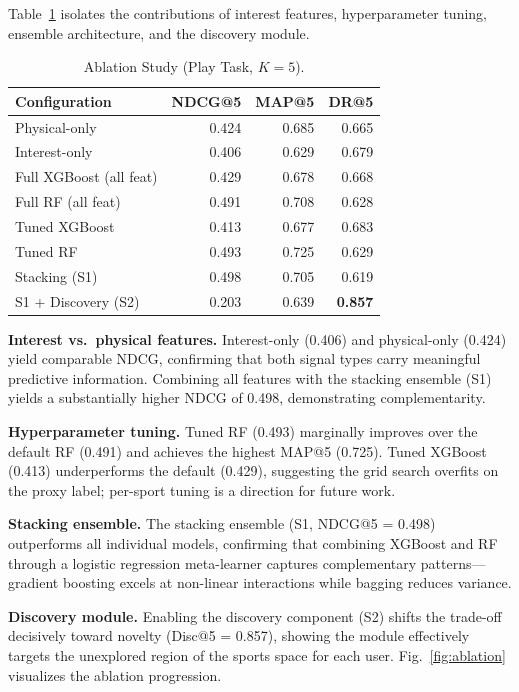 \documentclass[conference]{IEEEtran}
\begin{document}
Table~\ref{tab:ablation} isolates the contributions of interest features,
hyperparameter tuning, ensemble architecture, and the discovery module.

\begin{table}[t]
\caption{Ablation Study (Play Task, $K{=}5$).}
\label{tab:ablation}
\centering
\small
\begin{tabular}{lrrr}
\toprule
\textbf{Configuration} & \textbf{NDCG@5} & \textbf{MAP@5} & \textbf{DR@5} \\
\midrule
Physical-only           & 0.424 & 0.685 & 0.665 \\
Interest-only           & 0.406 & 0.629 & 0.679 \\
Full XGBoost (all feat) & 0.429 & 0.678 & 0.668 \\
Full RF (all feat)      & 0.491 & 0.708 & 0.628 \\
Tuned XGBoost           & 0.413 & 0.677 & 0.683 \\
Tuned RF                & 0.493 & 0.725 & 0.629 \\
Stacking (S1)           & 0.498 & 0.705 & 0.619 \\
S1 + Discovery (S2)     & 0.203 & 0.639 & \textbf{0.857} \\
\bottomrule
\end{tabular}
\end{table}

\noindent\textbf{Interest vs.\ physical features.}
Interest-only (0.406) and physical-only (0.424) yield comparable NDCG,
confirming that both signal types carry meaningful predictive information.
Combining all features with the stacking ensemble (S1) yields a
substantially higher NDCG of 0.498, demonstrating complementarity.

\noindent\textbf{Hyperparameter tuning.}
Tuned RF (0.493) marginally improves over the default RF (0.491) and
achieves the highest MAP@5 (0.725). Tuned XGBoost (0.413) underperforms
the default (0.429), suggesting the grid search overfits on the proxy
label; per-sport tuning is a direction for future work.

\noindent\textbf{Stacking ensemble.}
The stacking ensemble (S1, NDCG@5 = 0.498) outperforms all individual
models, confirming that combining XGBoost and RF through a logistic
regression meta-learner captures complementary patterns---gradient
boosting excels at non-linear interactions while bagging reduces variance.

\noindent\textbf{Discovery module.}
Enabling the discovery component (S2) shifts the trade-off decisively toward
novelty (Disc@5 = 0.857), showing the module effectively targets the
unexplored region of the sports space for each user.
Fig.~\ref{fig:ablation} visualizes the ablation progression.
\end{document}
